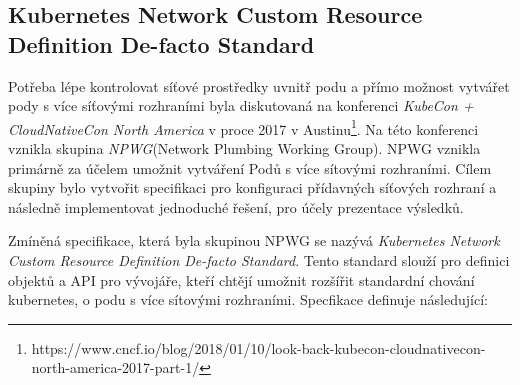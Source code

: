 \subsection{Kubernetes Network Custom Resource Definition De-facto Standard}
Potřeba lépe kontrolovat síťové prostředky uvnitř podu a přímo možnost vytvářet pody s více síťovými rozhraními byla diskutovaná na konferenci \textit{KubeCon + CloudNativeCon North America} v proce 2017 v Austinu\footnote{https://www.cncf.io/blog/2018/01/10/look-back-kubecon-cloudnativecon-north-america-2017-part-1/}. Na této konferenci vznikla skupina \textit{NPWG}(Network Plumbing Working Group). NPWG vznikla primárně za účelem umožnit vytváření Podů s více sítovými rozhraními. Cílem skupiny bylo vytvořit specifikaci pro konfiguraci přídavných síťových rozhraní a následně implementovat jednoduché řešení, pro účely prezentace výsledků.

Zmíněná specifikace, která byla skupinou NPWG se nazývá \textit{Kubernetes Network Custom Resource Definition De-facto Standard}. Tento standard slouží pro definici objektů a API pro vývojáře, kteří chtějí umožnit rozšířit standardní chování kubernetes, o podu s více sítovými rozhraními. Specfikace definuje následující:


